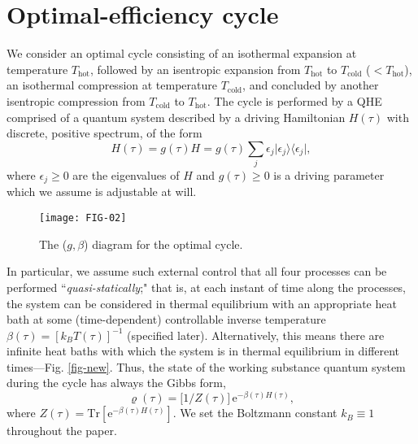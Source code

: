 \documentclass[aps,pra,floatfix,twocolumn,groupedaddress,superscriptaddress,nofootinbib,notitlepage,amsmath,amssymb,]{revtex4-1}
\begin{document}
\section{Optimal-efficiency cycle}
\label{sec:Id}

We consider an optimal cycle consisting of an isothermal expansion at temperature $T_{\mathrm{hot}}$, followed by an isentropic expansion from $T_{\mathrm{hot}}$ to $T_{\mathrm{cold}}$ ($< T_{\mathrm{hot}}$), an isothermal compression at temperature $T_{\mathrm{cold}}$, and concluded by another isentropic compression from $T_{\mathrm{cold}}$ to $T_{\mathrm{hot}}$. The cycle is performed by a QHE comprised of a quantum system described by a driving Hamiltonian $H(\tau)$ with discrete, positive spectrum, of the form 
\begin{equation}
\label{idH}
H(\tau)=g(\tau)H=g(\tau)\textstyle{\sum_{j}} \epsilon_{j}\vert\epsilon_j\rangle\langle\epsilon_j\vert,
\end{equation}
where $\epsilon_j\geqslant 0$ are the eigenvalues of $H$ and $g(\tau)\geqslant 0$ is a driving parameter which we assume is adjustable at will. 

\begin{figure}[bp]
	\texttt{[image: FIG-02]} 
	\caption{The ($g,\beta$) diagram for the optimal cycle.}
	\label{FIG--Diagram}
\end{figure}

In particular, we assume such external control that all four processes can be performed ``\textit{quasi-statically};" that is, at each instant of time along the processes, the system can be considered in thermal equilibrium with an appropriate heat bath at some (time-dependent) controllable inverse temperature $\beta(\tau)=[k_{B}T(\tau)]^{-1}$ (specified later). Alternatively, this means there are infinite heat baths with which the system is in thermal equilibrium in different times---Fig. \ref{fig-new}. Thus, the state of the working substance quantum system during the cycle has always the Gibbs form,
\begin{equation}
\label{Gibbs}
\varrho(\tau)=\big[1/Z(\tau)\big]\,\mathrm{e}^{-\beta(\tau) H(\tau)},
\end{equation} 
where $Z(\tau)=\mathrm{Tr}[\mathrm{e}^{-\beta(\tau) H(\tau)}]$. We set the Boltzmann constant $k_{B}\equiv 1$ throughout the paper.
\end{document}
